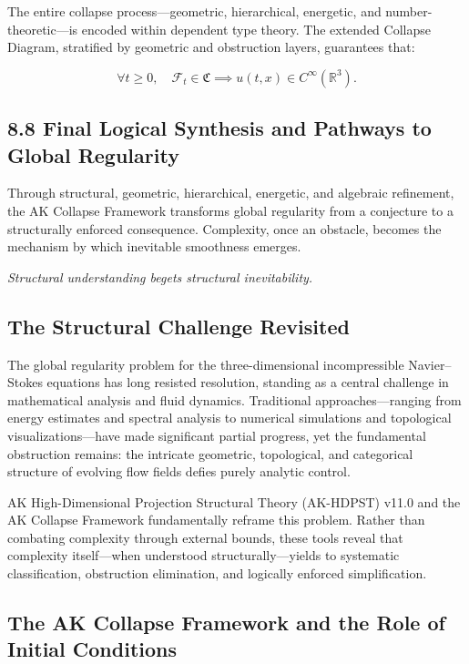 \documentclass[11pt]{article}
\begin{document}
The entire collapse process---geometric, hierarchical, energetic, and number-theoretic---is encoded within dependent type theory. The extended Collapse Diagram, stratified by geometric and obstruction layers, guarantees that:

\[\forall t \geq 0,\quad \mathcal{F}_t \in \mathfrak{C} \implies u(t, x) \in C^\infty(\mathbb{R}^3).\]

\subsection{8.8 Final Logical Synthesis and Pathways to Global Regularity}

Through structural, geometric, hierarchical, energetic, and algebraic refinement, the AK Collapse Framework transforms global regularity from a conjecture to a structurally enforced consequence. Complexity, once an obstacle, becomes the mechanism by which inevitable smoothness emerges.

\begin{center}
\textit{Structural understanding begets structural inevitability.}
\end{center}


\subsection{The Structural Challenge Revisited}

The global regularity problem for the three-dimensional incompressible Navier--Stokes equations has long resisted resolution, standing as a central challenge in mathematical analysis and fluid dynamics. Traditional approaches---ranging from energy estimates and spectral analysis to numerical simulations and topological visualizations---have made significant partial progress, yet the fundamental obstruction remains: the intricate geometric, topological, and categorical structure of evolving flow fields defies purely analytic control.

AK High-Dimensional Projection Structural Theory (AK-HDPST) v11.0 and the AK Collapse Framework fundamentally reframe this problem. Rather than combating complexity through external bounds, these tools reveal that complexity itself---when understood structurally---yields to systematic classification, obstruction elimination, and logically enforced simplification.

\subsection{The AK Collapse Framework and the Role of Initial Conditions}
\end{document}
